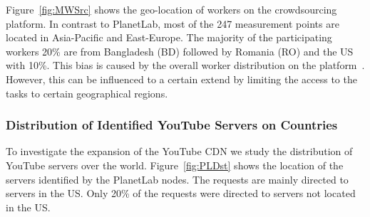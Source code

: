 
Figure~\ref{fig:MWSrc} shows the geo-location of workers on the crowdsourcing platform.
In contrast to PlanetLab, most of the 247 measurement points are located in Asia-Pacific and East-Europe.
The majority of the participating workers 20\% are from Bangladesh (BD) followed by Romania (RO) and the US with 10\%.
This bias is caused by the overall worker distribution on the platform~\cite{conf2011-410}. However, this can be influenced to a certain extend by limiting the access to the tasks to certain geographical regions.

\subsubsection{Distribution of Identified YouTube Servers on Countries}

To investigate the expansion of the YouTube CDN we study the distribution of YouTube servers over the world.
Figure~\ref{fig:PLDst} shows the location of the servers identified by the PlanetLab nodes.
The requests are mainly directed to servers in the US. Only 20\% of the requests were directed to servers not located in the US.

